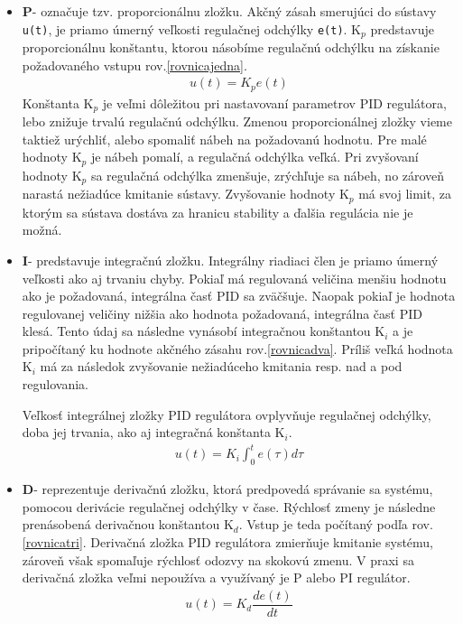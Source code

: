 \begin{itemize}
	\item \textbf{P}- označuje tzv. proporcionálnu zložku. Akčný zásah smerujúci do sústavy \verb|u(t)|, je priamo úmerný veľkosti regulačnej odchýlky \verb|e(t)|. K$_p$ predstavuje proporcionálnu konštantu, ktorou násobíme regulačnú odchýlku na získanie požadovaného vstupu rov.\ref{rovnicajedna}. 
	\begin{align}
		\label{rovnicajedna}
		u(t)=K_p e(t)
	\end{align}
	Konštanta K$_p$ je veľmi dôležitou pri nastavovaní parametrov PID regulátora, lebo znižuje trvalú regulačnú odchýlku. Zmenou proporcionálnej zložky vieme taktiež urýchliť, alebo spomaliť nábeh na požadovanú hodnotu. Pre malé hodnoty K$_p$ je nábeh pomalí, a regulačná odchýlka veľká. Pri zvyšovaní hodnoty K$_p$ sa regulačná odchýlka zmenšuje, zrýchľuje sa nábeh, no zároveň narastá nežiadúce kmitanie sústavy. Zvyšovanie hodnoty K$_p$ má svoj limit, za ktorým sa sústava dostáva za hranicu stability a ďalšia regulácia nie je možná. 
	
	\item \textbf{I}- predstavuje integračnú zložku. Integrálny riadiaci člen je priamo úmerný veľkosti ako aj trvaniu chyby. Pokiaľ má regulovaná veličina menšiu hodnotu ako je požadovaná, integrálna časť PID sa zväčšuje. Naopak pokiaľ je hodnota regulovanej veličiny nižšia ako hodnota požadovaná, integrálna časť PID klesá. Tento údaj sa následne vynásobí integračnou konštantou K$_i$ a je pripočítaný ku hodnote akčného zásahu rov.\ref{rovnicadva}. Príliš veľká hodnota K$_i$ má za následok zvyšovanie nežiadúceho kmitania resp. nad a pod regulovania. 
	
	Veľkosť integrálnej zložky PID regulátora ovplyvňuje regulačnej odchýlky, doba jej trvania, ako aj integračná konštanta K$_i$.
	\begin{align}
		\label{rovnicadva}
		u(t)=K_i  \int_{0}^{t} e(\tau)d\tau
	\end{align}
	
	\item \textbf{D}- reprezentuje derivačnú zložku, ktorá predpovedá správanie sa systému, pomocou derivácie regulačnej odchýlky v čase. Rýchlosť zmeny je následne prenásobená derivačnou konštantou K$_d$. Vstup je teda počítaný podľa rov.\ref{rovnicatri}. Derivačná zložka PID regulátora zmierňuje kmitanie systému, zároveň však spomaľuje rýchlosť odozvy na skokovú zmenu. V praxi sa derivačná zložka veľmi nepoužíva a využívaný je P alebo PI regulátor. 
	\begin{align}
		\label{rovnicatri}
		u(t)=K_d  \dfrac{de(t)}{dt}
	\end{align}
\end{itemize}

